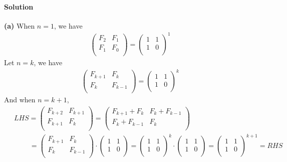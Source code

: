 \documentclass[a4paper]{scrartcl}
\begin{document}
\paragraph{Solution}
{\bfseries(a)} When $n=1$, we have \\
\begin{align*}
  \begin{pmatrix}
   F_{2} & F_1 \\
   F_1 & F_0 \\
  \end{pmatrix}
  =
  \begin{pmatrix}
    1 & 1 \\
    1 & 0 \\
  \end{pmatrix}^{\!1}
\end{align*}
Let $n=k$, we have\\
\begin{align*}
  \begin{pmatrix}
   F_{k+1} & F_k \\
   F_k & F_{k-1} \\
  \end{pmatrix}
  =
  \begin{pmatrix}
    1 & 1 \\
    1 & 0 \\
  \end{pmatrix}^{\!k}
\end{align*}
And when $n=k+1$,
\begin{align*}
  &\ LHS=
  \begin{pmatrix}
   F_{k+2} & F_{k+1} \\
   F_{k+1} & F_{k} \\
  \end{pmatrix} =
  \begin{pmatrix}
    F_{k+1} + F_{k} & F_k + F_{k-1}\\
    F_k + F_{k-1} & F_k \\
  \end{pmatrix} \\ &\
  \qquad\ = \begin{pmatrix}
    F_{k+1} & F_k\\
    F_k  & F_{k-1} \\
  \end{pmatrix}
  \cdot
  \begin{pmatrix}
    1 & 1 \\
    1 & 0 \\
  \end{pmatrix} =
  \begin{pmatrix}
    1 & 1 \\
    1 & 0 \\
  \end{pmatrix}^{\!k}
  \cdot
  \begin{pmatrix}
    1 & 1 \\
    1 & 0 \\
  \end{pmatrix} =
  \begin{pmatrix}
    1 & 1 \\
    1 & 0 \\
  \end{pmatrix}^{\!k+1} = RHS
\end{align*}
\end{document}

